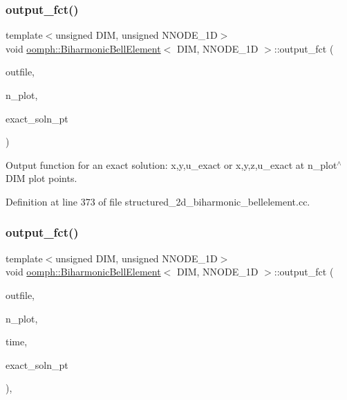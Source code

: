 \subsubsection{\texorpdfstring{output\+\_\+fct()}{output\_fct()}\hspace{0.1cm}{\footnotesize\ttfamily [1/2]}}
{\footnotesize\ttfamily template$<$unsigned D\+IM, unsigned N\+N\+O\+D\+E\+\_\+1D$>$ \\
void \hyperlink{classoomph_1_1BiharmonicBellElement}{oomph\+::\+Biharmonic\+Bell\+Element}$<$ D\+IM, N\+N\+O\+D\+E\+\_\+1D $>$\+::output\+\_\+fct (\begin{DoxyParamCaption}\item[{std\+::ostream \&}]{outfile,  }\item[{const unsigned \&}]{n\+\_\+plot,  }\item[{Finite\+Element\+::\+Steady\+Exact\+Solution\+Fct\+Pt}]{exact\+\_\+soln\+\_\+pt }\end{DoxyParamCaption})\hspace{0.3cm}{\ttfamily [inline]}}



Output function for an exact solution\+: x,y,u\+\_\+exact or x,y,z,u\+\_\+exact at n\+\_\+plot$^\wedge$\+D\+IM plot points. 



Definition at line 373 of file structured\+\_\+2d\+\_\+biharmonic\+\_\+bellelement.\+cc.

\mbox{\label{classoomph_1_1BiharmonicBellElement_ac383ee9d4eedfe0646062847af2a9b2e}} 
\subsubsection{\texorpdfstring{output\+\_\+fct()}{output\_fct()}\hspace{0.1cm}{\footnotesize\ttfamily [2/2]}}
{\footnotesize\ttfamily template$<$unsigned D\+IM, unsigned N\+N\+O\+D\+E\+\_\+1D$>$ \\
void \hyperlink{classoomph_1_1BiharmonicBellElement}{oomph\+::\+Biharmonic\+Bell\+Element}$<$ D\+IM, N\+N\+O\+D\+E\+\_\+1D $>$\+::output\+\_\+fct (\begin{DoxyParamCaption}\item[{std\+::ostream \&}]{outfile,  }\item[{const unsigned \&}]{n\+\_\+plot,  }\item[{const double \&}]{time,  }\item[{Finite\+Element\+::\+Unsteady\+Exact\+Solution\+Fct\+Pt}]{exact\+\_\+soln\+\_\+pt }\end{DoxyParamCaption})\hspace{0.3cm}{\ttfamily [inline]}, {\ttfamily [virtual]}}



